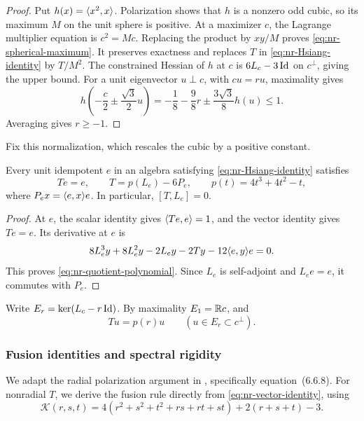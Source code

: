 \begin{proof}
Put \(h(x)=\langle x^2,x\rangle\). Polarization shows that \(h\) is a
nonzero odd cubic, so its maximum \(M\) on the unit sphere is positive.
At a maximizer \(c\), the Lagrange multiplier equation is \(c^2=Mc\).
Replacing the product by \(xy/M\) proves
\eqref{eq:nr-spherical-maximum}. It preserves exactness and replaces
\(T\) in \eqref{eq:nr-Hsiang-identity} by \(T/M^2\).
The constrained Hessian of \(h\) at \(c\) is
\(6L_c-3\operatorname{Id}\) on \(c^\perp\), giving the upper bound.
For a unit eigenvector \(u\perp c\), with \(cu=ru\), maximality gives
\[
 h\left(-\frac c2\pm\frac{\sqrt3}2u\right)
 =-\frac18-\frac98r\pm\frac{3\sqrt3}8h(u)\le1.
\]
Averaging gives \(r\ge-1\).
\end{proof}

Fix this normalization, which rescales the cubic by a positive constant.

\begin{lemma}
\label{lem:nr-idempotent-quotient}
Every unit idempotent \(e\) in an algebra satisfying
\eqref{eq:nr-Hsiang-identity} satisfies
\begin{equation}\label{eq:nr-quotient-polynomial}
 Te=e,\qquad T=p(L_e)-6P_e,\qquad p(t)=4t^3+4t^2-t,
\end{equation}
where \(P_ex=\langle e,x\rangle e\). In particular, \([T,L_e]=0\).
\end{lemma}

\begin{proof}
At \(e\), the scalar identity gives \(\langle Te,e\rangle=1\), and the
vector identity gives \(Te=e\). Its derivative at \(e\) is
\[
 8L_e^3y+8L_e^2y-2L_ey-2Ty-12\langle e,y\rangle e=0.
\]
This proves \eqref{eq:nr-quotient-polynomial}. Since \(L_e\) is
self-adjoint and \(L_ee=e\), it commutes with \(P_e\).
\end{proof}

Write \(E_r=\ker(L_c-r\operatorname{Id})\). By maximality \(E_1=\mathbb R c\), and
\begin{equation}\label{eq:nr-Peirce-quotient}
 Tu=p(r)u\qquad (u\in E_r\subset c^\perp).
\end{equation}

\subsubsection{Fusion identities and spectral rigidity}
\label{subsec:nr-spectral-rigidity}

We adapt the radial polarization argument in
\cite[Lemma~6.6.2]{NadirashviliTkachevVladut14}, specifically equation~(6.6.8).
For nonradial $T$, we derive the fusion rule directly from
\eqref{eq:nr-vector-identity}, using
\begin{equation}\label{eq:nr-fusion-polynomial}
 \mathscr K(r,s,t)=4(r^2+s^2+t^2+rs+rt+st)+2(r+s+t)-3.
\end{equation}

